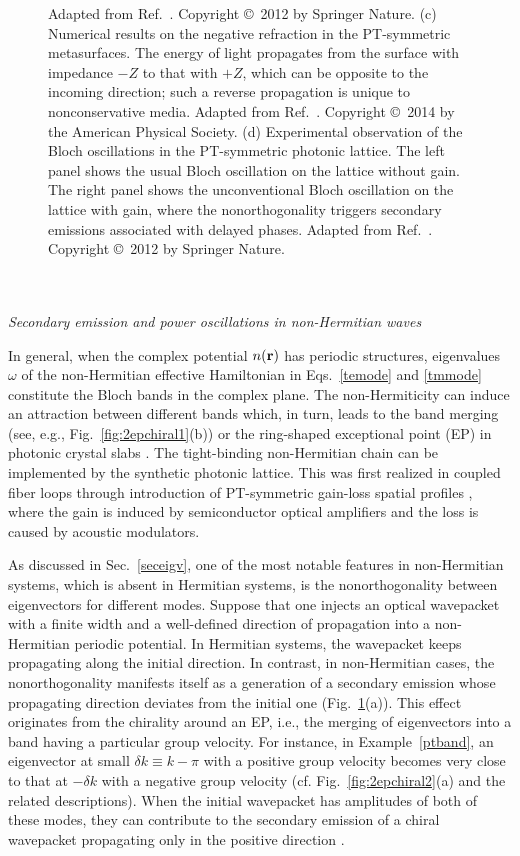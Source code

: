 \documentclass{tADP2e}
\theoremstyle{plain}
\theoremstyle{plain}
\theoremstyle{definition}
\begin{document}
\begin{figure}
{Adapted from Ref.~\cite{RA12pt}. Copyright \copyright\, 2012 by Springer Nature. 
(c) Numerical results on the negative refraction in the PT-symmetric metasurfaces. The energy of light propagates from the surface with impedance $-Z$ to that with $+Z$, which can be opposite to the incoming direction; such a reverse propagation is unique to nonconservative media. 
Adapted from Ref.~\cite{FR14}. Copyright \copyright\, 2014 by the American Physical Society. 
(d) Experimental observation of the Bloch oscillations in the PT-symmetric photonic lattice. The left panel shows the usual Bloch oscillation on the lattice without gain. The right panel shows the unconventional Bloch oscillation on the lattice with gain, where the nonorthogonality triggers secondary emissions associated with delayed phases. Adapted from Ref.~\cite{RA12pt}. Copyright \copyright\, 2012 by Springer Nature. 
}\label{fig:3optwave}
\end{figure}
\\
\\
{\it Secondary emission and power oscillations in non-Hermitian waves}

\vspace{3pt}
\noindent In general, when the complex potential $n({\bf r})$ has periodic structures,  eigenvalues $\omega$ of the non-Hermitian effective Hamiltonian in Eqs.~\eqref{temode} and \eqref{tmmode} constitute the Bloch bands in the complex plane. The non-Hermiticity can induce an attraction between different bands which, in turn, leads to the band merging (see, e.g., Fig.~\ref{fig:2epchiral1}(b))  or the ring-shaped exceptional point (EP) in photonic crystal slabs \cite{ZB15}.  The tight-binding non-Hermitian chain can be implemented by the synthetic photonic lattice. This was first realized in coupled fiber loops through introduction of PT-symmetric gain-loss spatial profiles \cite{RA12pt}, where the gain is induced by semiconductor optical amplifiers and the loss is caused by acoustic modulators.   

As discussed in Sec.~\ref{seceigv}, one of the most notable features in non-Hermitian systems, which is absent in Hermitian systems, is the nonorthogonality between eigenvectors for different modes. Suppose that one injects an optical wavepacket with a finite width and a well-defined direction of propagation into a non-Hermitian periodic potential. In Hermitian systems, the wavepacket keeps propagating along the initial direction. In contrast, in non-Hermitian cases, the nonorthogonality manifests itself as a generation of a secondary emission whose propagating direction deviates from the initial one \cite{KGM08,MZH08} (Fig.~\ref{fig:3optwave}(a)). This effect originates from the chirality around an EP, i.e., the merging of eigenvectors into a band having a particular group velocity. For instance, in Example~\ref{ptband}, an eigenvector at small $\delta k\equiv k-\pi$ with a positive group velocity becomes very close to that  at $-\delta k$ with a negative group velocity  (cf. Fig.~\ref{fig:2epchiral2}(a) and the related descriptions). When the initial wavepacket has amplitudes of both of these modes, they can contribute to the secondary emission of a chiral wavepacket propagating only in the positive direction \cite{KGM08}. 
    
\end{document}
